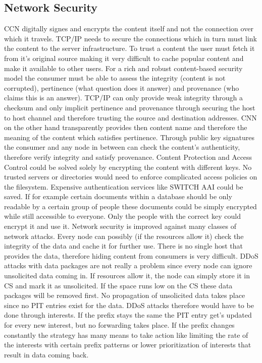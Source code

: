 \subsection{Network Security}

CCN digitally signes and encrypts the content itself and not the connection over which it travels. TCP/IP needs to secure the connections which in turn must link the content to the server infrastructure. To trust a content the user must fetch it from it's original source making it very difficult to cache popular content and make it available to other users. For a rich and robust content-based security model the consumer must be able to assess the integrity (content is not corrupted), pertinence (what question does it answer) and provenance (who claims this is an answer). TCP/IP can only provide weak integrity through a checksum and only implicit pertinence and provenance through securing the host to host channel and therefore trusting the source and destination addresses. CNN on the other hand transparently provides then content name and therefore the meaning of the content which satisfies pertinence. Through public key signatures the consumer and any node in between can check the content's authenticity, therefore verify integrity and satisfy provenance.
Content Protection and Access Control could be solved solely by encrypting the content with different keys. No trusted servers or directories would need to enforce complicated access policies on the filesystem. Expensive authentication services like SWITCH AAI could be saved. If for example certain documents within a database should be only readable by a certain group of people these documents could be simply encrypted while still accessible to everyone. Only the people with the correct key could encrypt it and use it.
Network security is improved against many classes of network attacks. Every node can possibly (if the resources allow it) check the integrity of the data and cache it for further use. There is no single host that provides the data, therefore hiding content from consumers is very difficult.
DDoS attacks with data packages are not really a problem since every node can ignore unsolicited data coming in. If resources allow it, the node can simply store it in CS and mark it as unsolicited. If the space runs low on the CS these data packages will be removed first. No propagation of unsolicited data takes place since no PIT entries exist for the data. DDoS attacks therefore would have to be done through interests. If the prefix stays the same the PIT entry get's updated for every new interest, but no forwarding takes place. If the prefix changes constantly the strategy has many means to take action like limiting the rate of the interests with certain prefix patterns or lower prioritization of interests that result in data coming back. 

